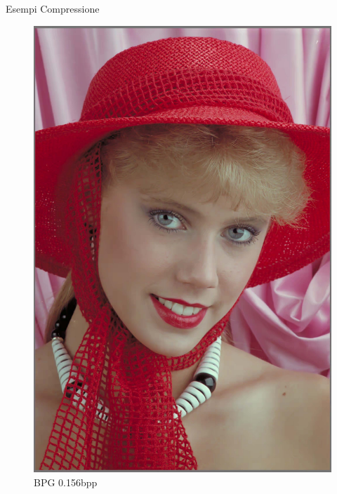 \begin{frame}{Esempi Compressione}
\begin{figure}[!ht]
\begin{minipage}[]{0.13\linewidth}
                \includegraphics[width=\textwidth]{Immagini/IMAGES/BPG_3_IMG0004.pdf}
                \caption{BPG 0.156bpp}
                \label{fig:ExampleBPG}
            \end{minipage}
            \begin{minipage}[]{0.13\linewidth}
                \centering

\end{minipage}
\end{figure}
\end{frame}
